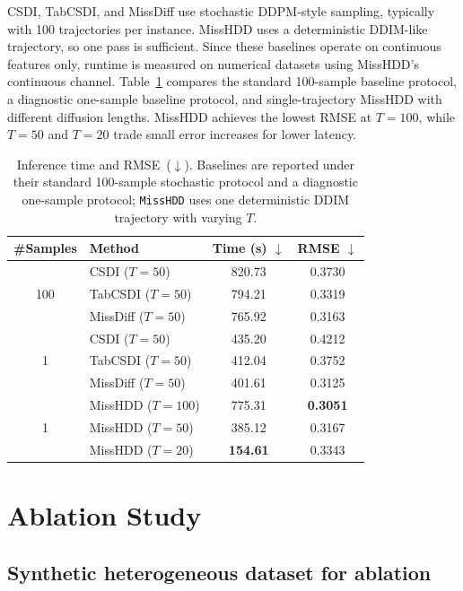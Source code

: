 \documentclass[times, review, 10pt]{elsarticle}
\begin{document}
CSDI, TabCSDI, and MissDiff use stochastic DDPM-style sampling, typically with
100 trajectories per instance. MissHDD uses a deterministic DDIM-like
trajectory, so one pass is sufficient. Since these baselines operate on
continuous features only, runtime is measured on numerical datasets using
MissHDD's continuous channel. Table~\ref{tab:inference_summary} compares the
standard 100-sample baseline protocol, a diagnostic one-sample baseline
protocol, and single-trajectory MissHDD with different diffusion lengths.
MissHDD achieves the lowest RMSE at $T{=}100$, while $T{=}50$ and $T{=}20$
trade small error increases for lower latency.
\begin{table}[!t]
\centering
\caption{
Inference time and RMSE~($\downarrow$). Baselines are reported under their
standard 100-sample stochastic protocol and a diagnostic one-sample protocol;
\texttt{MissHDD} uses one deterministic DDIM trajectory with varying $T$.
}
\label{tab:inference_summary}
\begin{tabular}{c|l|c|c}
\hline
\textbf{\#Samples} & \textbf{Method}
& \textbf{Time (s) $\downarrow$}
& \textbf{RMSE $\downarrow$} \\
\hline
\multirow{3}{*}{100}
& CSDI ($T{=}50$)      & 820.73 & 0.3730 \\
& TabCSDI ($T{=}50$)   & 794.21 & 0.3319 \\
& MissDiff ($T{=}50$)  & 765.92 & 0.3163 \\
\hline
\multirow{3}{*}{1}
& CSDI ($T{=}50$)      & 435.20 & 0.4212 \\
& TabCSDI ($T{=}50$)   & 412.04 & 0.3752 \\
& MissDiff ($T{=}50$)  & 401.61 & 0.3125 \\
\hline
\multirow{3}{*}{1}
& MissHDD ($T{=}100$) & 775.31 & \textbf{0.3051} \\
& MissHDD ($T{=}50$)  & 385.12 & 0.3167 \\
& MissHDD ($T{=}20$)  & \textbf{154.61} & 0.3343 \\
\hline
\end{tabular}
\end{table}








\section{Ablation Study}


\subsection{Synthetic heterogeneous dataset for ablation}
\end{document}
